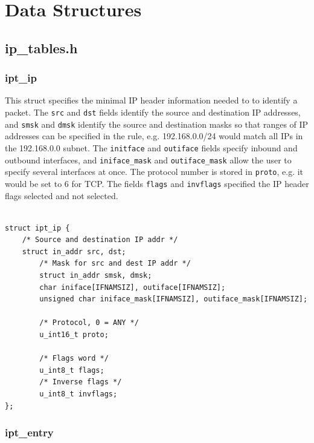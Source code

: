 \documentclass[a4paper,10pt]{article}
\newcommand{\code}[1]{\texttt{#1}}
\begin{document}
\section{Data Structures}
  

\subsection{ip\_tables.h}


\subsubsection{ipt\_ip}\label{ipt_ip}

This struct specifies the minimal IP header information needed
to to identify a packet. The \code{src} and \code{dst} fields identify
the source and destination IP addresses, and \code{smsk} and
\code{dmsk} identify the source and destination masks so that ranges
of IP addresses can be specified in the rule, e.g. 192.168.0.0/24
would match all IPs in the 192.168.0.0 subnet. The \code{initface} and
\code{outiface} fields specify inbound and outbound interfaces, and
\code{iniface\_mask} and \code{outiface\_mask} allow the user to specify several
interfaces at once. The protocol number is stored in \code{proto},
e.g. it would be set to 6 for TCP. The fields \code{flags} and
\code{invflags} specified the IP header flags selected and not selected.

\begin{lstlisting}

struct ipt_ip {
	/* Source and destination IP addr */
	struct in_addr src, dst;
        /* Mask for src and dest IP addr */
        struct in_addr smsk, dmsk;
        char iniface[IFNAMSIZ], outiface[IFNAMSIZ];
        unsigned char iniface_mask[IFNAMSIZ], outiface_mask[IFNAMSIZ];

        /* Protocol, 0 = ANY */
        u_int16_t proto;

        /* Flags word */
        u_int8_t flags;
        /* Inverse flags */
        u_int8_t invflags;
};

\end{lstlisting}

\subsubsection{ipt\_entry}
\end{document}
